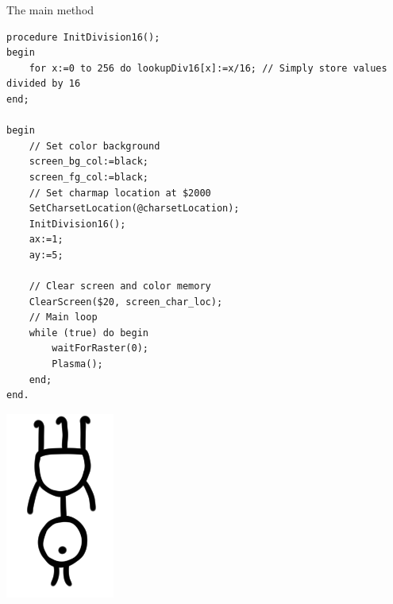 The main method\\
\begin{minipage}{0.8\textwidth}
\begin{lstlisting}
procedure InitDivision16();
begin
	for x:=0 to 256 do lookupDiv16[x]:=x/16; // Simply store values divided by 16
end;

begin
	// Set color background
	screen_bg_col:=black;
	screen_fg_col:=black;
	// Set charmap location at $2000
	SetCharsetLocation(@charsetLocation);
	InitDivision16();
	ax:=1;
	ay:=5;

	// Clear screen and color memory
	ClearScreen($20, screen_char_loc);
	// Main loop
	while (true) do begin
		waitForRaster(0);
		Plasma();
	end;
end.
\end{lstlisting}
\end{minipage}
\begin{minipage}{0.2\textwidth}
\includegraphics[width=\linewidth]{images/trip/trip15.png}
\end{minipage}




